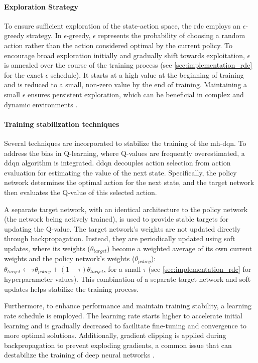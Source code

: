 \paragraph{Exploration Strategy}
To ensure sufficient exploration of the state-action space, the \gls{rdc} employs an $\epsilon$-greedy strategy.
In $\epsilon$-greedy, $\epsilon$ represents the probability of choosing a random action rather than the action considered optimal by the current policy.
To encourage broad exploration initially and gradually shift towards exploitation, $\epsilon$ is annealed over the course of the training process (see \autoref{sec:implementation_rdc} for the exact $\epsilon$ schedule).
It starts at a high value at the beginning of training and is reduced to a small, non-zero value by the end of training.
Maintaining a small $\epsilon$ ensures persistent exploration, which can be beneficial in complex and dynamic environments \cite{zhang_why_2020}.

\paragraph{Training stabilization techniques}
Several techniques are incorporated to stabilize the training of the \gls{mh-dqn}.
To address the bias in Q-learning, where Q-values are frequently overestimated, a \gls{ddqn} algorithm \cite{hasselt_deep_2016} is integrated.
\gls{ddqn} decouples action selection from action evaluation for estimating the value of the next state.
Specifically, the policy network determines the optimal action for the next state, and the target network then evaluates the Q-value of this selected action.

A separate target network, with an identical architecture to the policy network (the network being actively trained), is used to provide stable targets for updating the Q-value.
The target network's weights are not updated directly through backpropagation.
Instead, they are periodically updated using soft updates, where its weights ($\theta_{target}$) become a weighted average of its own current weights and the policy network's weights ($\theta_{policy}$): $\theta_{target} \leftarrow \tau \theta_{policy} + (1-\tau)\theta_{target}$, for a small $\tau$ (see \autoref{sec:implementation_rdc} for hyperparameter values).
This combination of a separate target network and soft updates helps stabilize the training process.

Furthermore, to enhance performance and maintain training stability, a learning rate schedule is employed.
The learning rate starts higher to accelerate initial learning and is gradually decreased to facilitate fine-tuning and convergence to more optimal solutions.
Additionally, gradient clipping is applied during backpropagation to prevent exploding gradients, a common issue that can destabilize the training of deep neural networks \cite{zhang_why_2020}.

